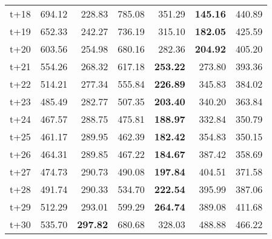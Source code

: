 \begin{table}[H]
\begin{tabular}{lrrrrrr}
t+18  & 694.12  & 228.83  & 785.08  & 351.29  & \textbf{145.16}  & 440.89  \\
t+19  & 652.33  & 242.27  & 736.19  & 315.10  & \textbf{182.05}  & 425.59  \\
t+20  & 603.56  & 254.98  & 680.16  & 282.36  & \textbf{204.92}  & 405.20  \\
t+21  & 554.26  & 268.32  & 617.18  & \textbf{253.22}  & 273.80  & 393.36  \\
t+22  & 514.21  & 277.34  & 555.84  & \textbf{226.89}  & 345.83  & 384.02  \\
t+23  & 485.49  & 282.77  & 507.35  & \textbf{203.40}  & 340.20  & 363.84  \\
t+24  & 467.57  & 288.75  & 475.81  & \textbf{188.97}  & 332.84  & 350.79  \\
t+25  & 461.17  & 289.95  & 462.39  & \textbf{182.42}  & 354.83  & 350.15  \\
t+26  & 464.31  & 289.85  & 467.22  & \textbf{184.67}  & 387.42  & 358.69  \\
t+27  & 474.73  & 290.73  & 490.08  & \textbf{197.84}  & 404.51  & 371.58  \\
t+28  & 491.74  & 290.33  & 534.70  & \textbf{222.54}  & 395.99  & 387.06  \\
t+29  & 512.29  & 293.01  & 599.29  & \textbf{264.74}  & 389.08  & 411.68  \\
t+30  & 535.70  & \textbf{297.82}  & 680.68  & 328.03  & 488.88  & 466.22  \\

\bottomrule
\end{tabular}
\end{table}
